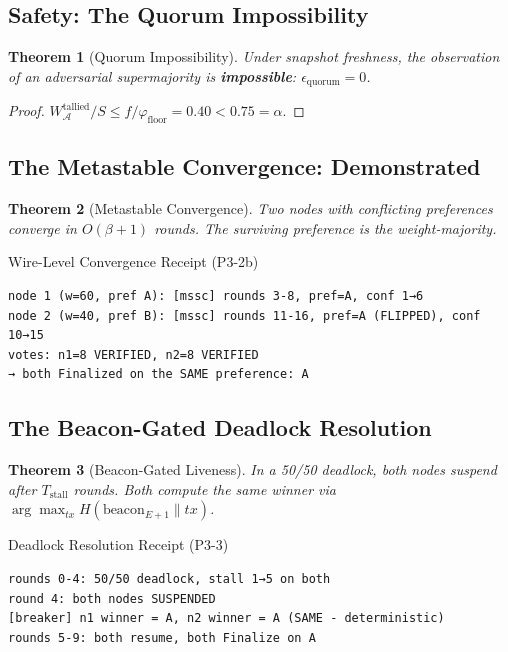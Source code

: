 \documentclass[11pt, a4paper]{article}
\newtheorem{theorem}{Theorem}
\begin{document}
\subsection{Safety: The Quorum Impossibility}

\begin{theorem}[Quorum Impossibility]
\label{thm:quorum}
Under snapshot freshness, the observation of an adversarial
supermajority is \textbf{impossible}: $\epsilon_{\text{quorum}} = 0$.
\end{theorem}
\begin{proof}
 $W_{\mathcal{A}}^{\text{tallied}} / S \le f / \varphi_{\text{floor}}
= 0.40 < 0.75 = \alpha$.
\end{proof}

\subsection{The Metastable Convergence: Demonstrated}

\begin{theorem}[Metastable Convergence]
\label{thm:convergence}
Two nodes with conflicting preferences converge in $O(\beta + 1)$ rounds. The surviving preference is the weight-majority.
\end{theorem}

\begin{receiptbox}{Wire-Level Convergence Receipt (P3-2b)}
\begin{verbatim}
node 1 (w=60, pref A): [mssc] rounds 3-8, pref=A, conf 1→6
node 2 (w=40, pref B): [mssc] rounds 11-16, pref=A (FLIPPED), conf 10→15
votes: n1=8 VERIFIED, n2=8 VERIFIED
→ both Finalized on the SAME preference: A
\end{verbatim}
\end{receiptbox}

\subsection{The Beacon-Gated Deadlock Resolution}

\begin{theorem}[Beacon-Gated Liveness]
\label{thm:beacon}
In a 50/50 deadlock, both nodes suspend after $T_{\text{stall}}$ rounds.
Both compute the same winner via $\arg\max_{tx} H(\text{beacon}_{E+1} \| tx)$.
\end{theorem}

\begin{receiptbox}{Deadlock Resolution Receipt (P3-3)}
\begin{verbatim}
rounds 0-4: 50/50 deadlock, stall 1→5 on both
round 4: both nodes SUSPENDED
[breaker] n1 winner = A, n2 winner = A (SAME - deterministic)
rounds 5-9: both resume, both Finalize on A
\end{verbatim}
\end{receiptbox}
\end{document}
